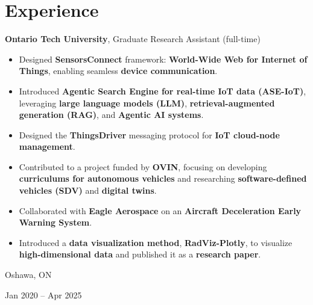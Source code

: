\documentclass[10pt, letterpaper]{article}
\newenvironment{highlights}{
    \begin{itemize}[
        topsep=0.10 cm,
        parsep=0.10 cm,
        partopsep=0pt,
        itemsep=0pt,
        leftmargin=0.4 cm + 10pt
    ]
}{
    \end{itemize}
} %
\newenvironment{twocolentry}[2][]{
    \onecolentry
    \def\secondColumn{#2}
    \setcolumnwidth{\fill, 4.5 cm}
    \begin{paracol}{2}
}{
    \switchcolumn \raggedleft \secondColumn
    \end{paracol}
    \endonecolentry
} %
\begin{document}
\vspace{-0.2cm}
\section{Experience}



        
        \begin{twocolentry}{
            Oshawa, ON

        Jan 2020 – Apr 2025
        }
            \textbf{Ontario Tech University}, Graduate Research Assistant (full-time)
            \begin{highlights}
            \item Designed \textbf{SensorsConnect} framework: \textbf{World-Wide Web for Internet of Things}, enabling seamless \textbf{device communication}.
            \item Introduced \textbf{Agentic Search Engine for real-time IoT data (ASE-IoT)}, leveraging \textbf{large language models (LLM)}, \textbf{retrieval-augmented generation (RAG)}, and \textbf{Agentic AI systems}.
            \item Designed the \textbf{ThingsDriver} messaging protocol for \textbf{IoT cloud-node management}.
            \item Contributed to a project funded by \textbf{OVIN}, focusing on developing \textbf{curriculums for autonomous vehicles} and researching \textbf{software-defined vehicles (SDV)} and \textbf{digital twins}.
            \item Collaborated with \textbf{Eagle Aerospace} on an \textbf{Aircraft Deceleration Early Warning System}.
            \item Introduced a \textbf{data visualization method}, \textbf{RadViz-Plotly}, to visualize \textbf{high-dimensional data} and published it as a \textbf{research paper}.
        \end{highlights}

        \end{twocolentry}


        \vspace{0.2 cm}
\end{document}
